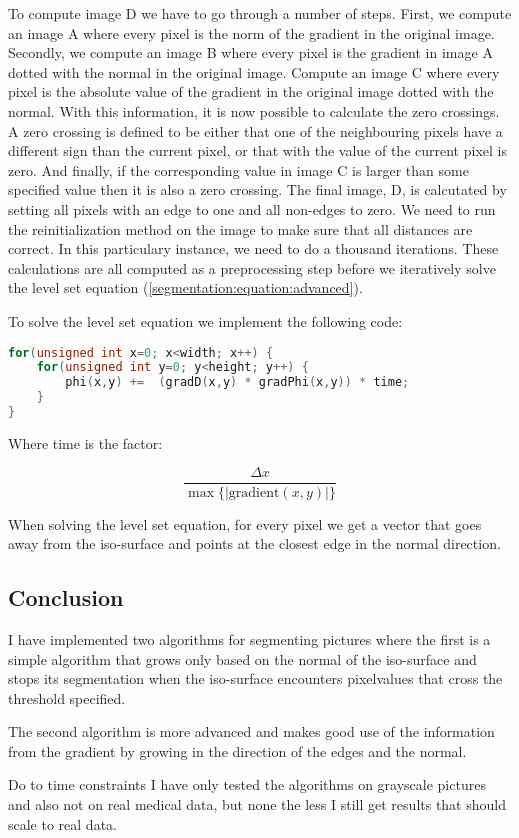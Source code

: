To compute image D we have to go through a number of steps. First, we compute an image A where every pixel is the norm of the gradient in the original image. Secondly, we compute an image B where every pixel is the gradient in image A dotted with the normal in the original image. Compute an image C where every pixel is the absolute value of the gradient in the original image dotted with the normal.
With this information, it is now possible to calculate the zero crossings. A zero crossing is defined to be either that one of the neighbouring pixels have a different sign than the current pixel, or that with the value of the current pixel is zero. And finally, if the corresponding value in image C is larger than some specified value then it is also a zero crossing. The final image, D, is calcutated by setting all pixels with an edge to one and all non-edges to zero. We need to run the reinitialization method on the image to make sure that all distances are correct. In this particulary instance, we need to do a thousand iterations. These calculations are all computed as a preprocessing step before we iteratively solve the level set equation (\ref{segmentation:equation:advanced}).


To solve the level set equation we implement the following code:
\begin{lstlisting}[language=c++]
for(unsigned int x=0; x<width; x++) {
    for(unsigned int y=0; y<height; y++) {
        phi(x,y) +=  (gradD(x,y) * gradPhi(x,y)) * time;
    }
}
\end{lstlisting}

Where time is the factor:

\begin{equation*}
  \dfrac{\Delta x} {\max \{|\textrm{gradient}(x,y)|\}} 
\end{equation*}

When solving the level set equation, for every pixel we get a vector that goes away from the iso-surface and points at the closest edge in the normal direction.

\subsection{Conclusion}
\label{segmentation:conclusion}

I have implemented two algorithms for segmenting pictures where the first is a simple algorithm that grows only based on the normal of the iso-surface and stops its segmentation when the iso-surface encounters pixelvalues that cross the threshold specified.

The second algorithm is more advanced and makes good use of the information from the gradient by growing in the direction of the edges and the normal.

Do to time constraints I have only tested the algorithms on grayscale pictures and also not on real medical data, but none the less I still get results that should scale to real data.

